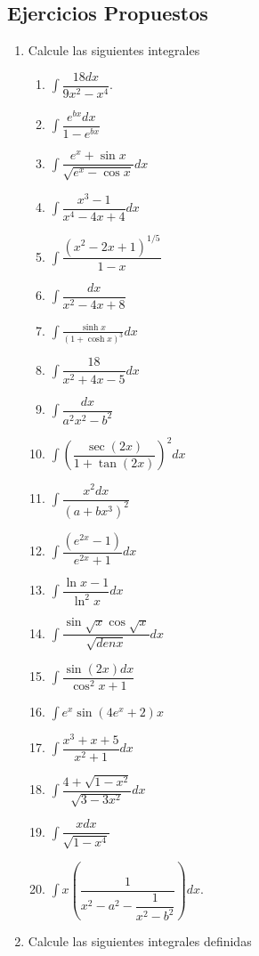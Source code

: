 \documentclass[10pt,twoside]{SelfArx} %
\begin{document}
 
 
 \subsection{Ejercicios Propuestos}
\begin{enumerate}
	\item Calcule las siguientes integrales
	\begin{enumerate}
		\item $ \displaystyle\int \dfrac{18dx}{9x^{2}-x^{4}} $.
		\item $ \displaystyle\int \dfrac{e^{bx}dx}{1-e^{bx}} $
		\item $ \displaystyle\int \dfrac{e^{x}+\sin x}{\sqrt{e^{x}-\cos x}}dx $
		\item $ \displaystyle\int \dfrac{x^{3}-1}{x^{4}-4x+4}dx $
		\item $ \displaystyle\int\dfrac{(x^{2}-2x+1)^{1/5}}{1-x} $
		\item $ \displaystyle\int \dfrac{dx}{x^{2}-4x+8} $
		\item $ \displaystyle\int \frac{\sinh x}{(1+\cosh x)^{3}}dx $
		\item $ \displaystyle\int \dfrac{18}{x^{2}+4x-5}dx $
		\item $ \displaystyle\int \dfrac{dx}{a^{2}x^{2}-b^{2}} $
		\item $ \displaystyle\int \left (\dfrac{\sec(2x)}{1+\tan(2x)}\right )^{2}dx $
		\item $ \displaystyle\int \dfrac{x^{2}dx}{(a+bx^{3})^{2}} $
		\item $ \displaystyle\int \dfrac{(e^{2x}-1)}{e^{2x}+1}dx $
		\item $ \displaystyle\int \dfrac{\ln x-1}{\ln^{2}x}dx $
		\item $ \displaystyle\int \dfrac{\sin\sqrt{x}\cos\sqrt{x}}{\sqrt{denx}}dx $
		\item $ \displaystyle\int \dfrac{\sin(2x)dx}{\cos^{2}x+1} $
		\item $ \displaystyle\int e^{x}\sin(4e^{x}+2)x $
		\item $ \displaystyle\int \dfrac{x^{3}+x+5}{x^{2}+1}dx $
		\item $ \displaystyle\int\dfrac{4+\sqrt{1-x^{2}}}{\sqrt{3-3x^{2}}}dx $
		\item $ \displaystyle\int \dfrac{xdx}{\sqrt{1-x^{4}}} $
		\item $ \displaystyle\int x\left (\dfrac{1}{x^{2}-a^{2}-\dfrac{1}{x^{2}-b^{2}}}\right )dx $.
    \end{enumerate}		
    \item Calcule las siguientes integrales definidas

\end{enumerate}
\end{document}
